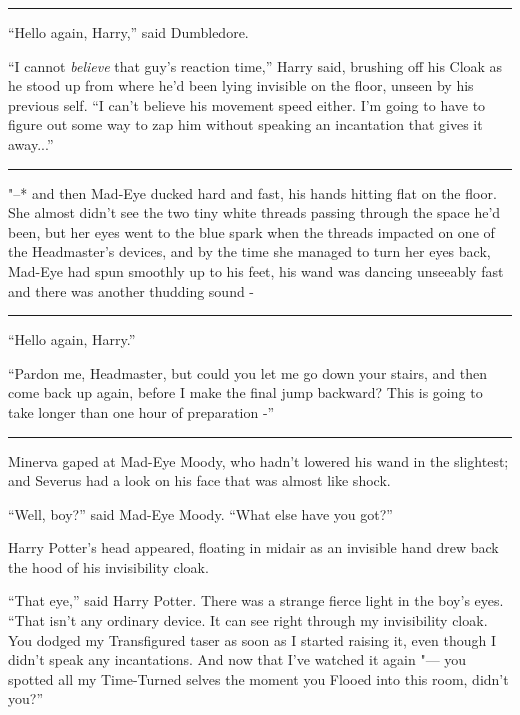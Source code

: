 \begin{center}\rule{3in}{0.4pt}\end{center}

``Hello again, Harry,'' said Dumbledore.

``I cannot \emph{believe} that guy's reaction time,'' Harry said,
brushing off his Cloak as he stood up from where he'd been lying
invisible on the floor, unseen by his previous self. ``I can't believe
his movement speed either. I'm going to have to figure out some way to
zap him without speaking an incantation that gives it away...''

\begin{center}\rule{3in}{0.4pt}\end{center}

"--* and then Mad-Eye ducked hard and fast, his hands hitting flat on the
floor. She almost didn't see the two tiny white threads passing through
the space he'd been, but her eyes went to the blue spark when the
threads impacted on one of the Headmaster's devices, and by the time she
managed to turn her eyes back, Mad-Eye had spun smoothly up to his feet,
his wand was dancing unseeably fast and there was another thudding sound
-

\begin{center}\rule{3in}{0.4pt}\end{center}

``Hello again, Harry.''

``Pardon me, Headmaster, but could you let me go down your stairs, and
then come back up again, before I make the final jump backward? This is
going to take longer than one hour of preparation -''

\begin{center}\rule{3in}{0.4pt}\end{center}

Minerva gaped at Mad-Eye Moody, who hadn't lowered his wand in the
slightest; and Severus had a look on his face that was almost like
shock.

``Well, boy?'' said Mad-Eye Moody. ``What else have you got?''

Harry Potter's head appeared, floating in midair as an invisible hand
drew back the hood of his invisibility cloak.

``That eye,'' said Harry Potter. There was a strange fierce light in the
boy's eyes. ``That isn't any ordinary device. It can see right through
my invisibility cloak. You dodged my Transfigured taser as soon as I
started raising it, even though I didn't speak any incantations. And now
that I've watched it again "--- you spotted all my Time-Turned selves the
moment you Flooed into this room, didn't you?''

